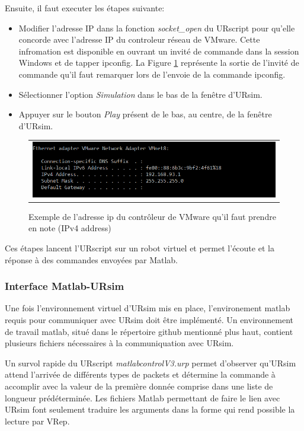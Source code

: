 \documentclass[root.tex]{subfiles}
\begin{document}
Ensuite, il faut executer les étapes suivante:
\begin{itemize}
\item Modifier l'adresse IP dans la fonction \textit{socket\_open} du URscript pour qu'elle concorde avec l'adresse IP du controleur réseau de VMware. Cette infromation est disponible en ouvrant un invité de commande dans la session Windows et de tapper ipconfig. La Figure \ref{fig:windows_ip} représente la sortie de l'invité de commande qu'il faut remarquer lors de l'envoie de la commande ipconfig.
\item Sélectionner l'option \textit{Simulation} dans le bas de la fenêtre d'URsim.
\item Appuyer sur le bouton \textit{Play} présent de le bas, au centre, de la fenêtre d'URsim.
\end{itemize}
\begin{figure}
 \begin{center}
  \begin{tabular}{c}
    \includegraphics[trim=0cm 0cm 0cm 0cm, scale=0.5]{screenshots_tuto_ursim/windows_ip.png}
  \end{tabular}
 \end{center}
\caption{Exemple de l'adresse ip du contrôleur de VMware qu'il faut prendre en note (IPv4 address)}
 \label{fig:windows_ip}
\end{figure}
Ces étapes lancent l'URscript sur un robot virtuel et permet l'écoute et la réponse à des commandes envoyées par Matlab.


\subsubsection{Interface Matlab-URsim}

Une fois l'environnement virtuel d'URsim mis en place, l'environement matlab requis pour communiquer avec URsim doit être implémenté.
Un environnement de travail matlab, situé dans le répertoire github mentionné plus haut, contient plusieurs fichiers nécessaires à la communiquation avec URsim.

Un survol rapide du URscript \textit{matlabcontrolV3.urp} permet d'observer qu'URsim attend l'arrivée de différents types de packets et détermine la commande à accomplir avec la valeur de la première donnée comprise dans une liste de longueur prédéterminée. Les fichiers Matlab permettant de faire le lien avec URsim font seulement traduire les arguments dans la forme qui rend possible la lecture par VRep.
\end{document}
